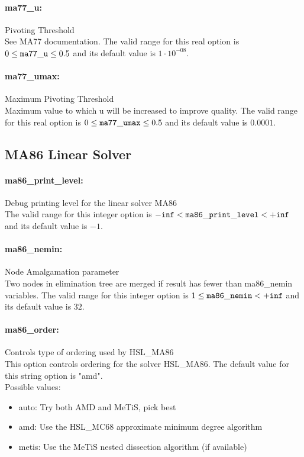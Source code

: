 \paragraph{ma77\_u:}\label{opt:ma77_u} Pivoting Threshold \\
 See MA77 documentation. The valid range for this real option is 
$0 \le {\tt ma77\_u } \le 0.5$
and its default value is $1 \cdot 10^{-08}$.


\paragraph{ma77\_umax:}\label{opt:ma77_umax} Maximum Pivoting Threshold \\
 Maximum value to which u will be increased to improve quality. The valid range for this real option is 
$0 \le {\tt ma77\_umax } \le 0.5$
and its default value is $0.0001$.


\subsection{MA86 Linear Solver}

\paragraph{ma86\_print\_level:}\label{opt:ma86_print_level} Debug printing level for the linear solver MA86 \\
 The valid range for this integer option is
${\tt -inf} <  {\tt ma86\_print\_level } <  {\tt +inf}$
and its default value is $-1$.


\paragraph{ma86\_nemin:}\label{opt:ma86_nemin} Node Amalgamation parameter \\
 Two nodes in elimination tree are merged if result has fewer than ma86\_nemin variables. The valid range for this integer option is
$1 \le {\tt ma86\_nemin } <  {\tt +inf}$
and its default value is $32$.


\paragraph{ma86\_order:}\label{opt:ma86_order} Controls type of ordering used by HSL\_MA86 \\
 This option controls ordering for the solver HSL\_MA86. The default value for this string option is "amd".
\\ 
Possible values:
\begin{itemize}
   \item auto: Try both AMD and MeTiS, pick best
   \item amd: Use the HSL\_MC68 approximate minimum degree algorithm
   \item metis: Use the MeTiS nested dissection algorithm (if available)
\end{itemize}

